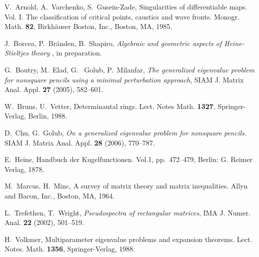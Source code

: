 \documentclass[10pt,twoside,a4paper,reqno]{amsart}
\theoremstyle{plain}
\theoremstyle{definition}
\theoremstyle{remark}
\begin{document}
\begin{thebibliography}{9999999}

 V.~Arnold, A.~Varchenko, S.~Gusein-Zade,
 Singularities of differentiable maps. Vol. I. The classification of critical points, caustics and wave fronts.
Monogr. Math. {\bf 82}, Birkh\"auser Boston, Inc., Boston, MA, 1985.

J.~Borcea, P.~Br\"anden, B.~Shapiro, {\em Algebraic and geometric aspects of Heine-Stieltjes theory }, in preparation.

 G.~Boutry,  M.~Elad, G.~ Golub,  P.~Milanfar,  {\em The generalized eigenvalue problem for nonsquare pencils using a minimal perturbation approach}, SIAM J. Matrix Anal. Appl. {\bf 27} (2005), 582--601.

 W.~Bruns,  U.~Vetter,  Determinantal rings. Lect. Notes Math. {\bf 1327}, Springer-Verlag, Berlin, 1988.

 D.~Chu, G.~Golub, {\em  On a generalized eigenvalue problem for nonsquare pencils.} SIAM J. Matrix Anal. Appl. {\bf 28} (2006), 770--787.

 E.~Heine, Handbuch der Kugelfunctionen. Vol.1,
pp.~472--479, Berlin: G. Reimer Verlag, 1878.

M.~Marcus, H.~Minc, A survey of matrix theory and matrix inequalities. Allyn and Bacon, Inc., Boston, MA, 1964.

 L.~Trefethen, T.~Wright,  {\em  Pseudospectra of rectangular matrices}, IMA J. Numer. Anal. {\bf 22} (2002), 501--519.

H.~Volkmer, Multiparameter eigenvalue problems and
expansion theorems. Lect. Notes. Math. {\bf 1356}, Springer-Verlag, 1988.

\end{thebibliography}
\end{document}

